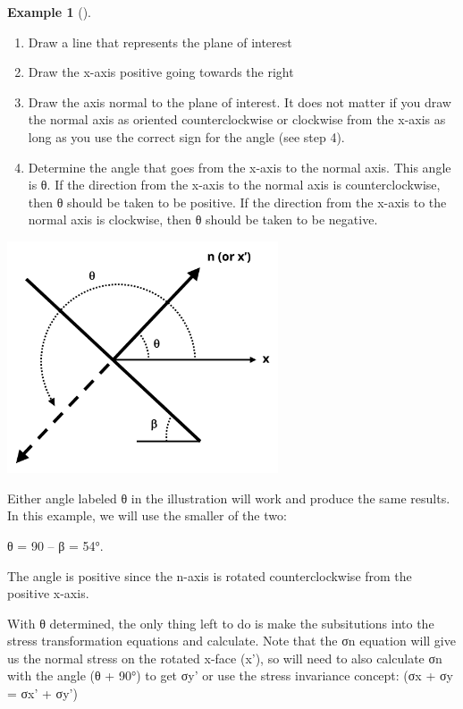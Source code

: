 \documentclass[
  letterpaper,
  DIV=11,
  numbers=noendperiod]{scrreprt}
\theoremstyle{definition}
\newtheorem{example}{Example}[chapter]
\theoremstyle{remark}
\begin{document}
\begin{tcolorbox}
\begin{example}[]
\begin{tcolorbox}
\begin{enumerate}
\def\labelenumi{\arabic{enumi}.}
\item
  Draw a line that represents the plane of interest
\item
  Draw the x-axis positive going towards the right
\item
  Draw the axis normal to the plane of interest. It does not matter if
  you draw the normal axis as oriented counterclockwise or clockwise
  from the x-axis as long as you use the correct sign for the angle (see
  step 4).
\item
  Determine the angle that goes from the x-axis to the normal axis. This
  angle is θ. If the direction from the x-axis to the normal axis is
  counterclockwise, then θ should be taken to be positive. If the
  direction from the x-axis to the normal axis is clockwise, then θ
  should be taken to be negative.
\end{enumerate}

\begin{center}
\includegraphics[width=3.15625in,height=\textheight]{images/CH12 figures/example 12.2 part 2.png}
\end{center}

Either angle labeled θ in the illustration will work and produce the
same results. In this example, we will use the smaller of the two:

θ = 90 -- β = 54°.

The angle is positive since the n-axis is rotated counterclockwise from
the positive x-axis.

With θ determined, the only thing left to do is make the subsitutions
into the stress transformation equations and calculate. Note that the σn
equation will give us the normal stress on the rotated x-face (x'), so
will need to also calculate σn with the angle (θ + 90°) to get σy' or
use the stress invariance concept: (σx + σy = σx' + σy')


\end{tcolorbox}
\end{example}
\end{tcolorbox}
\end{document}
